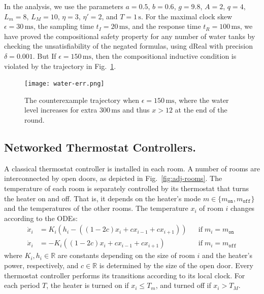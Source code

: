 In the analysis, we use the parameters 
$a = 0.5$, $b = 0.6$, $g = 9.8$, $A = 2$, $q = 4$, $L_m = 8$, $L_M = 10$,
$\eta = 3$, $\eta' = 2$, and $T = 1\,\mathrm{s}$.
%
For the maximal clock skew $\epsilon = 30\,\mathrm{ms}$,
the sampling time $t_I = 20\,\mathrm{ms}$,
and the response time $t_R = 100\,\mathrm{ms}$,
we have proved the compositional safety property
 for any number of water tanks
 by checking the unsatisfiability of the negated formulas,
 using \textsf{dReal} with precision $\delta = 0.001$.
But If $\epsilon = 150\,\mathrm{ms}$,
then the compositional inductive condition is violated by the trajectory in Fig.~\ref{fig:water-error}.

\begin{figure}
\centering
\texttt{[image: water-err.png]}    
\caption{The counterexample trajectory when $\epsilon = 150\,\mathrm{ms}$,
where the water level increases for extra $300\,\mathrm{ms}$ and thus $x > 12$ at the end of the round.} \label{fig:water-error}
\end{figure}





\subsection{Networked Thermostat Controllers.}

A classical thermostat controller  \cite{henzinger2000theory} is installed in each room.
A number of rooms are interconnected by open doors, 
as depicted in Fig.~\ref{fig:adj-rooms}.
The temperature of each room is separately controlled by its thermostat that turns the heater on and off.
That is, it %
depends on
the heater's mode $m \in \{m_\texttt{on}, m_\texttt{off}\}$  and the temperatures of the other rooms.
The temperature $x_i$ of room $i$
changes according to the ODEs:
\begin{align*}
\dot{x}_i &= K_i (h_i - ((1- 2 c) x_i + c x_{i-1} + c x_{i+1})) &&\mbox{if}\; m_i = m_\texttt{on}
\\
\dot{x}_i &= - K_i ((1- 2 c) x_i + c x_{i-1} + c x_{i+1}) && \mbox{if}\; m_i = m_\texttt{off}
\end{align*}
where $K_i, h_i \in \mathbb{R}$ are constants depending on
the size of room $i$ and the heater's power, respectively,
and $c \in \mathbb{R}$ is determined by the size of the open door.
%
Every thermostat controller performs its transitions
according to its local clock.
For each period $T$, 
the heater is turned on if $x_i \leq T_m$,
and turned off if $x_i > T_M$.

